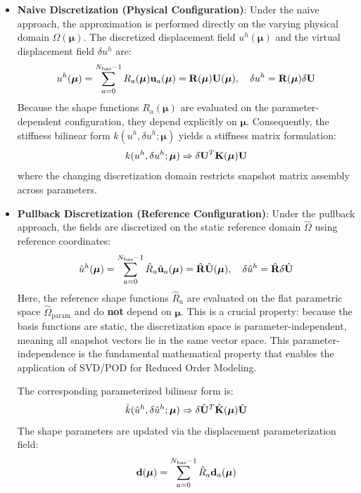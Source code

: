 \begin{itemize}
    \item \textbf{Naive Discretization (Physical Configuration)}:
          Under the naive approach, the approximation is performed directly on the varying physical domain $\Omega(\boldsymbol{\mu})$. The discretized displacement field $u^h(\boldsymbol{\mu})$ and the virtual displacement field $\delta u^h$ are:
          \begin{equation}
              u^h(\boldsymbol{\mu}) = \sum_{a=0}^{N_{\text{bas}}-1} R_a(\boldsymbol{\mu}) \mathbf{u}_a(\boldsymbol{\mu}) = \mathbf{R}(\boldsymbol{\mu}) \mathbf{U}(\boldsymbol{\mu}), \quad \delta u^h = \mathbf{R}(\boldsymbol{\mu}) \delta\mathbf{U}
          \end{equation}
          Because the shape functions $R_a(\boldsymbol{\mu})$ are evaluated on the parameter-dependent configuration, they depend explicitly on $\boldsymbol{\mu}$. Consequently, the stiffness bilinear form $k(u^h, \delta u^h; \boldsymbol{\mu})$ yields a stiffness matrix formulation:
          \begin{equation}
              k(u^h, \delta u^h; \boldsymbol{\mu}) \Rightarrow \delta\mathbf{U}^T \mathbf{K}(\boldsymbol{\mu}) \mathbf{U}
          \end{equation}
          where the changing discretization domain restricts snapshot matrix assembly across parameters.

    \item \textbf{Pullback Discretization (Reference Configuration)}:
          Under the pullback approach, the fields are discretized on the static reference domain $\hat{\Omega}$ using reference coordinates:
          \begin{equation}
              \hat{u}^h(\boldsymbol{\mu}) = \sum_{a=0}^{N_{\text{bas}}-1} \hat{R}_a \hat{\mathbf{u}}_a(\boldsymbol{\mu}) = \hat{\mathbf{R}} \hat{\mathbf{U}}(\boldsymbol{\mu}), \quad \delta\hat{u}^h = \hat{\mathbf{R}} \delta\hat{\mathbf{U}}
          \end{equation}
          Here, the reference shape functions $\hat{R}_a$ are evaluated on the flat parametric space $\hat{\Omega}_{\text{param}}$ and do \textbf{not} depend on $\boldsymbol{\mu}$. This is a crucial property: because the basis functions are static, the discretization space is parameter-independent, meaning all snapshot vectors lie in the same vector space. This parameter-independence is the fundamental mathematical property that enables the application of SVD/POD for Reduced Order Modeling.

          The corresponding parameterized bilinear form is:
          \begin{equation}
              \hat{k}(\hat{u}^h, \delta\hat{u}^h; \boldsymbol{\mu}) \Rightarrow \delta\hat{\mathbf{U}}^T \hat{\mathbf{K}}(\boldsymbol{\mu}) \hat{\mathbf{U}}
          \end{equation}
          The shape parameters are updated via the displacement parameterization field:
          \begin{equation}
              \mathbf{d}(\boldsymbol{\mu}) = \sum_{a=0}^{N_{\text{bas}}-1} \hat{R}_a \mathbf{d}_a(\boldsymbol{\mu})
          \end{equation}
\end{itemize}
